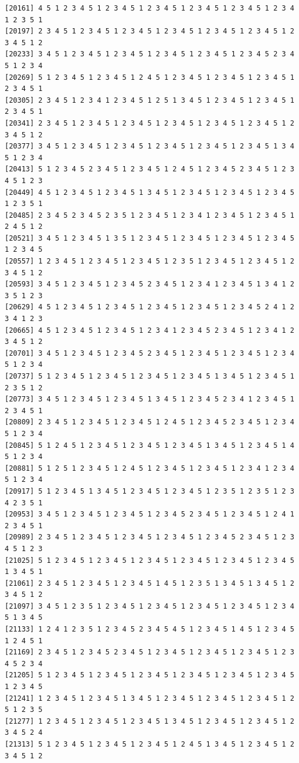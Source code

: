 \documentclass[
  english,
]{book}
\begin{document}
\begin{verbatim}
[20161] 4 5 1 2 3 4 5 1 2 3 4 5 1 2 3 4 5 1 2 3 4 5 1 2 3 4 5 1 2 3 4 1 2 3 5 1
[20197] 2 3 4 5 1 2 3 4 5 1 2 3 4 5 1 2 3 4 5 1 2 3 4 5 1 2 3 4 5 1 2 3 4 5 1 2
[20233] 3 4 5 1 2 3 4 5 1 2 3 4 5 1 2 3 4 5 1 2 3 4 5 1 2 3 4 5 2 3 4 5 1 2 3 4
[20269] 5 1 2 3 4 5 1 2 3 4 5 1 2 4 5 1 2 3 4 5 1 2 3 4 5 1 2 3 4 5 1 2 3 4 5 1
[20305] 2 3 4 5 1 2 3 4 1 2 3 4 5 1 2 5 1 3 4 5 1 2 3 4 5 1 2 3 4 5 1 2 3 4 5 1
[20341] 2 3 4 5 1 2 3 4 5 1 2 3 4 5 1 2 3 4 5 1 2 3 4 5 1 2 3 4 5 1 2 3 4 5 1 2
[20377] 3 4 5 1 2 3 4 5 1 2 3 4 5 1 2 3 4 5 1 2 3 4 5 1 2 3 4 5 1 3 4 5 1 2 3 4
[20413] 5 1 2 3 4 5 2 3 4 5 1 2 3 4 5 1 2 4 5 1 2 3 4 5 2 3 4 5 1 2 3 4 5 1 2 3
[20449] 4 5 1 2 3 4 5 1 2 3 4 5 1 3 4 5 1 2 3 4 5 1 2 3 4 5 1 2 3 4 5 1 2 3 5 1
[20485] 2 3 4 5 2 3 4 5 2 3 5 1 2 3 4 5 1 2 3 4 1 2 3 4 5 1 2 3 4 5 1 2 4 5 1 2
[20521] 3 4 5 1 2 3 4 5 1 3 5 1 2 3 4 5 1 2 3 4 5 1 2 3 4 5 1 2 3 4 5 1 2 3 4 5
[20557] 1 2 3 4 5 1 2 3 4 5 1 2 3 4 5 1 2 3 5 1 2 3 4 5 1 2 3 4 5 1 2 3 4 5 1 2
[20593] 3 4 5 1 2 3 4 5 1 2 3 4 5 2 3 4 5 1 2 3 4 1 2 3 4 5 1 3 4 1 2 3 5 1 2 3
[20629] 4 5 1 2 3 4 5 1 2 3 4 5 1 2 3 4 5 1 2 3 4 5 1 2 3 4 5 2 4 1 2 3 4 1 2 3
[20665] 4 5 1 2 3 4 5 1 2 3 4 5 1 2 3 4 1 2 3 4 5 2 3 4 5 1 2 3 4 1 2 3 4 5 1 2
[20701] 3 4 5 1 2 3 4 5 1 2 3 4 5 2 3 4 5 1 2 3 4 5 1 2 3 4 5 1 2 3 4 5 1 2 3 4
[20737] 5 1 2 3 4 5 1 2 3 4 5 1 2 3 4 5 1 2 3 4 5 1 3 4 5 1 2 3 4 5 1 2 3 5 1 2
[20773] 3 4 5 1 2 3 4 5 1 2 3 4 5 1 3 4 5 1 2 3 4 5 2 3 4 1 2 3 4 5 1 2 3 4 5 1
[20809] 2 3 4 5 1 2 3 4 5 1 2 3 4 5 1 2 4 5 1 2 3 4 5 2 3 4 5 1 2 3 4 5 1 2 3 4
[20845] 5 1 2 4 5 1 2 3 4 5 1 2 3 4 5 1 2 3 4 5 1 3 4 5 1 2 3 4 5 1 4 5 1 2 3 4
[20881] 5 1 2 5 1 2 3 4 5 1 2 4 5 1 2 3 4 5 1 2 3 4 5 1 2 3 4 1 2 3 4 5 1 2 3 4
[20917] 5 1 2 3 4 5 1 3 4 5 1 2 3 4 5 1 2 3 4 5 1 2 3 5 1 2 3 5 1 2 3 4 2 3 5 1
[20953] 3 4 5 1 2 3 4 5 1 2 3 4 5 1 2 3 4 5 2 3 4 5 1 2 3 4 5 1 2 4 1 2 3 4 5 1
[20989] 2 3 4 5 1 2 3 4 5 1 2 3 4 5 1 2 3 4 5 1 2 3 4 5 2 3 4 5 1 2 3 4 5 1 2 3
[21025] 5 1 2 3 4 5 1 2 3 4 5 1 2 3 4 5 1 2 3 4 5 1 2 3 4 5 1 2 3 4 5 1 3 4 5 1
[21061] 2 3 4 5 1 2 3 4 5 1 2 3 4 5 1 4 5 1 2 3 5 1 3 4 5 1 3 4 5 1 2 3 4 5 1 2
[21097] 3 4 5 1 2 3 5 1 2 3 4 5 1 2 3 4 5 1 2 3 4 5 1 2 3 4 5 1 2 3 4 5 1 3 4 5
[21133] 1 2 4 1 2 3 5 1 2 3 4 5 2 3 4 5 4 5 1 2 3 4 5 1 4 5 1 2 3 4 5 1 2 4 5 1
[21169] 2 3 4 5 1 2 3 4 5 2 3 4 5 1 2 3 4 5 1 2 3 4 5 1 2 3 4 5 1 2 3 4 5 2 3 4
[21205] 5 1 2 3 4 5 1 2 3 4 5 1 2 3 4 5 1 2 3 4 5 1 2 3 4 5 1 2 3 4 5 1 2 3 4 5
[21241] 1 2 3 4 5 1 2 3 4 5 1 3 4 5 1 2 3 4 5 1 2 3 4 5 1 2 3 4 5 1 2 5 1 2 3 5
[21277] 1 2 3 4 5 1 2 3 4 5 1 2 3 4 5 1 3 4 5 1 2 3 4 5 1 2 3 4 5 1 2 3 4 5 2 4
[21313] 5 1 2 3 4 5 1 2 3 4 5 1 2 3 4 5 1 2 4 5 1 3 4 5 1 2 3 4 5 1 2 3 4 5 1 2

\end{verbatim}
\end{document}
